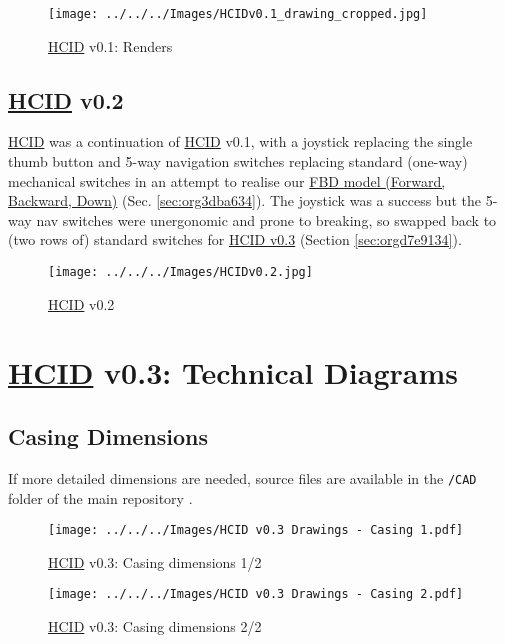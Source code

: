 \documentclass[logo,bsc,singlespacing,parskip]{infthesis}
\begin{document}
\begin{figure}[h]
\centering
\texttt{[image: ../../../Images/HCIDv0.1\_drawing\_cropped.jpg]}
\caption{\hyperref[orgc00eca5]{HCID} v0.1: Renders}
\end{figure}

\section{\hyperref[orgc00eca5]{HCID} v0.2}
\label{sec:orgb792e3e}
\hyperref[orgc00eca5]{HCID} was a continuation of \hyperref[orgc00eca5]{HCID} v0.1, with a joystick replacing the single thumb button and 5-way navigation switches \autocite{5wayNavigationSwitch} replacing standard (one-way) mechanical switches in an attempt to realise our \hyperref[sec:org3dba634]{FBD model (Forward, Backward, Down)} (Sec. \ref{sec:org3dba634}).
The joystick was a success but the 5-way nav switches were unergonomic and prone to breaking, so swapped back to (two rows of) standard switches for \hyperref[sec:orgd7e9134]{HCID v0.3} (Section \ref{sec:orgd7e9134}).

\begin{figure}[h]
\centering
\texttt{[image: ../../../Images/HCIDv0.2.jpg]}
\caption{\hyperref[orgc00eca5]{HCID} v0.2}
\end{figure}

\chapter{\hyperref[orgc00eca5]{HCID} v0.3: Technical Diagrams}
\label{sec:org16392cd}
\section{Casing Dimensions}
\label{sec:org4fa4582}
If more detailed dimensions are needed, source files are available in the \texttt{/CAD} folder of the main repository \autocite{sharpNazzacodeHCIDMy}.

\begin{landscape}
\begin{figure}[htbp]
\centering
\texttt{[image: ../../../Images/HCID v0.3 Drawings - Casing 1.pdf]}
\caption{\hyperref[orgc00eca5]{HCID} v0.3: Casing dimensions 1/2}
\end{figure}
\end{landscape}

\begin{landscape}
\begin{figure}[htbp]
\centering
\texttt{[image: ../../../Images/HCID v0.3 Drawings - Casing 2.pdf]}
\caption{\hyperref[orgc00eca5]{HCID} v0.3: Casing dimensions 2/2}
\end{figure}
\end{landscape}
\restoregeometry
\end{document}
